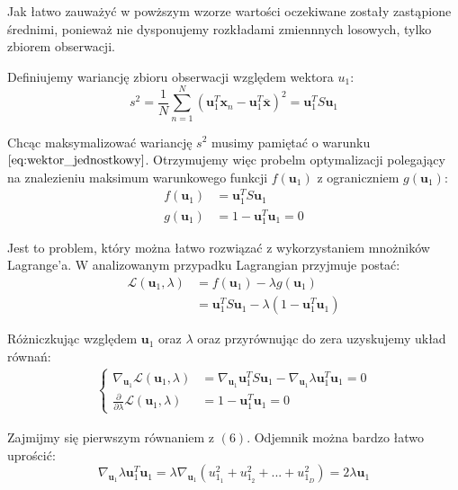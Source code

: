 \documentclass{article}
\newcommand{\bb}{\textbf}
\begin{document}
Jak łatwo zauważyć w powższym wzorze wartości oczekiwane zostały zastąpione średnimi, ponieważ nie dysponujemy rozkładami zmiennnych losowych, tylko zbiorem obserwacji.

Definiujemy wariancję zbioru obserwacji względem wektora $u_1$:
\begin{equation}
	s^2 = \frac{1}{N} \sum_{n=1}^{N}(\bb{u}_1^T \bb{x}_n - \bb{u}_1^T\overline{\bb{x}})^2 = \bb{u}_1^T S \bb{u}_1
\end{equation}

Chcąc maksymalizować wariancję $s^2$ musimy pamiętać o warunku $\ref{eq:wektor_jednostkowy}$. Otrzymujemy więc probelm optymalizacji polegający na znalezieniu maksimum warunkowego funkcji $f(\bb{u}_1)$ z ograniczniem $g(\bb{u}_1)$:
\begin{align*}
	f(\bb{u}_1) &= \bb{u}_1^T S \bb{u}_1 \\
	g(\bb{u}_1) &= 1 - \bb{u}_1^T \bb{u}_1 = 0
\end{align*}

Jest to problem, który można łatwo rozwiązać z wykorzystaniem mnożników Lagrange'a. W analizowanym przypadku Lagrangian przyjmuje postać:
\begin{align*}
	\mathcal{L}(\bb{u}_1, \lambda) &= f(\bb{u}_1) - \lambda g(\bb{u}_1) \\
				&= \bb{u}_1^T S \bb{u}_1 - \lambda(1 - \bb{u}_1^T \bb{u}_1)
\end{align*}

Różniczkując względem $\bb{u}_1$ oraz $\lambda$ oraz przyrównując do zera uzyskujemy układ równań:
\begin{align}
\begin{cases}
	\nabla_{\bb{u}_1} \mathcal{L} (\bb{u}_1, \lambda) &= \nabla_{\bb{u}_1} \bb{u}_1^T S \bb{u}_1 - \nabla_{\bb{u}_1} \lambda \bb{u}_1^T \bb{u}_1 = 0 \\
	\frac{\partial}{\partial \lambda} \mathcal{L} (\bb{u}_1, \lambda) &= 1 - \bb{u}_1^T \bb{u}_1 = 0
\end{cases}
\end{align}

Zajmijmy się pierwszym równaniem z $(6)$. Odjemnik można bardzo łatwo uprościć:
\begin{equation}
	\nabla_{\bb{u}_1} \lambda \bb{u}_1^T \bb{u}_1 = \lambda \nabla_{\bb{u}_1} 
		(u_{1_1}^2 + u_{1_2}^2 + ... + u_{1_D}^2)
	 	= 2 \lambda \bb{u}_1
\end{equation}
\end{document}
